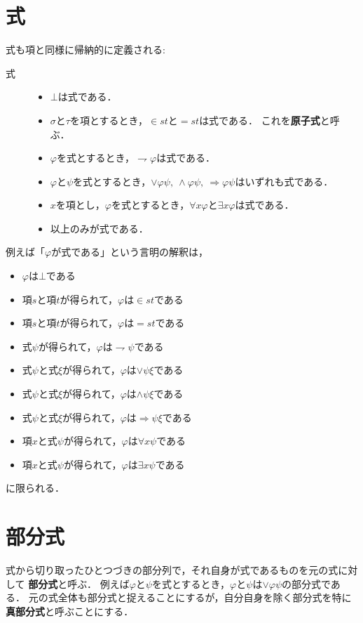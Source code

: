 \documentclass[a4j,10.5pt,oneside,openany]{jsbook}
\theoremstyle{mystyle}
\begin{document}
\section{式}
	式も項と同様に帰納的に定義される:
	
	\begin{description}
		\item[式]
			\begin{itemize}
				\item $\bot$は式である．
				\item $\sigma$と$\tau$を項とするとき，$\in st$と$=st$は式である．
					これを{\bf 原子式}と呼ぶ．
				\item $\varphi$を式とするとき，$\rightharpoondown \varphi$は式である．
				\item $\varphi$と$\psi$を式とするとき，$\vee \varphi \psi,\ 
					\wedge \varphi \psi,\ \Longrightarrow \varphi \psi$はいずれも式である．
			
				\item $x$を項とし，$\varphi$を式とするとき，$\forall x \varphi$と$\exists x \varphi$は式である．
				
				\item 以上のみが式である．
			\end{itemize}
	\end{description}
	
	例えば「$\varphi$が式である」という言明の解釈は，
	\begin{itemize}
		\item $\varphi$は$\bot$である
		\item 項$s$と項$t$が得られて，$\varphi$は$\in s t$である
		\item 項$s$と項$t$が得られて，$\varphi$は$= s t$である
		\item 式$\psi$が得られて，$\varphi$は$\rightharpoondown \psi$である
		\item 式$\psi$と式$\xi$が得られて，$\varphi$は$\vee \psi \xi$である
		\item 式$\psi$と式$\xi$が得られて，$\varphi$は$\wedge \psi \xi$である
		\item 式$\psi$と式$\xi$が得られて，$\varphi$は$\Longrightarrow \psi \xi$である
		\item 項$x$と式$\psi$が得られて，$\varphi$は$\forall x \psi$である
		\item 項$x$と式$\psi$が得られて，$\varphi$は$\exists x \psi$である
	\end{itemize}
	に限られる．
	
\section{部分式}
	式から切り取ったひとつづきの部分列で，それ自身が式であるものを元の式に対して
	{\bf 部分式}と呼ぶ．
	例えば$\varphi$と$\psi$を式とするとき，$\varphi$と$\psi$は$\vee \varphi \psi$の部分式である．
	元の式全体も部分式と捉えることにするが，自分自身を除く部分式を特に
	{\bf 真部分式}と呼ぶことにする．
	
\end{document}
